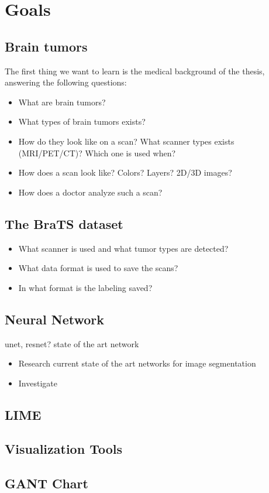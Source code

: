 \chapter{Goals}

\section{Brain tumors}
The first thing we want to learn is the medical background of the thesis, answering the following questions:
\begin{itemize}
    \item What are brain tumors?
    \item What types of brain tumors exists?
    \item How do they look like on a scan? What scanner types exists (MRI/PET/CT)? Which one is used when?
    \item How does a scan look like? Colors? Layers? 2D/3D images?
    \item How does a doctor analyze such a scan?
\end{itemize}

\section{The BraTS dataset}
\begin{itemize}
    \item What scanner is used and what tumor types are detected?
    \item What data format is used to save the scans?
    \item In what format is the labeling saved?
\end{itemize}

\section{Neural Network}
unet, resnet? state of the art network

\begin{itemize}
    \item Research current state of the art networks for image segmentation
    \item Investigate 
\end{itemize}


\section{LIME}

\section{Visualization Tools}

\section{}


\section{GANT Chart}
